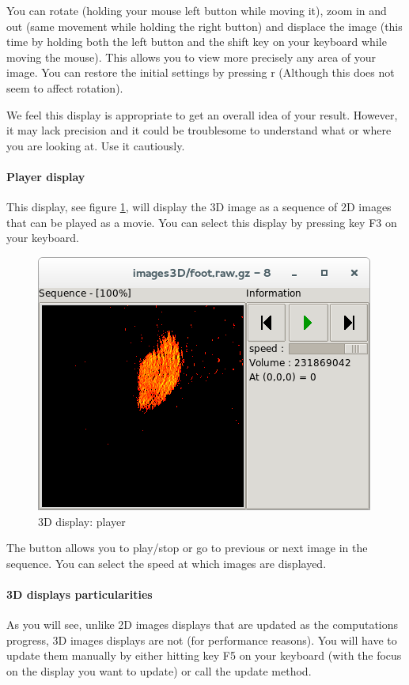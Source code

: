 \documentclass[a4paper,10pt,oneside]{article}
\begin{document}
You can rotate (holding your mouse left button while moving it), zoom in and
out (same movement while holding the right button) and displace the image
(this time by holding both the left button and the shift key on your keyboard
while moving the mouse). This allows you to view more precisely any area of
your image. You can restore the initial settings by pressing r (Although this
does not seem to affect rotation).

We feel this display is appropriate to get an overall idea of your
result. However, it may lack precision and it could be troublesome to
understand what or where you are looking at. Use it cautiously.

\paragraph{Player display}

This display, see figure \ref{fig:dis3D_play}, will display the 3D image
as a sequence of 2D images that can be played as a movie.
You can select this display by pressing key F3 on your keyboard.

\begin{figure}
\centering
\includegraphics[scale=0.5]{images/dis3D_player.png}
\caption{3D display: player}
\label{fig:dis3D_play}
\end{figure}

The button allows you to play/stop or go to previous or next image in the
sequence. You can select the speed at which images are displayed.

\paragraph{3D displays particularities}
As you will see, unlike 2D images displays that are updated as the computations
progress, 3D images displays are not (for performance reasons). You will have
to update them manually by either hitting key F5 on your keyboard (with
the focus on the display you want to update) or call the update method.
\end{document}
